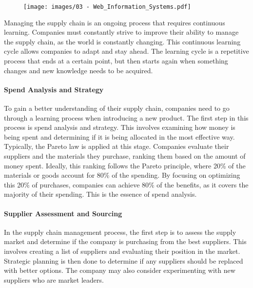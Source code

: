 \begin{figure}[!h]
  \centering
  \texttt{[image: images/03 - Web\_Information\_Systems.pdf]}
\end{figure}

Managing the supply chain is an ongoing process that requires continuous
learning. Companies must constantly strive to improve their ability to
manage the supply chain, as the world is constantly changing. This
continuous learning cycle allows companies to adapt and stay ahead. The
learning cycle is a repetitive process that ends at a certain point, but
then starts again when something changes and new knowledge needs to be
acquired.

\paragraph{Spend Analysis and
  Strategy}\label{spend-analysis-and-strategy}

To gain a better understanding of their supply chain, companies need to
go through a learning process when introducing a new product. The first
step in this process is spend analysis and strategy. This involves
examining how money is being spent and determining if it is being
allocated in the most effective way. Typically, the Pareto law is
applied at this stage. Companies evaluate their suppliers and the
materials they purchase, ranking them based on the amount of money
spent. Ideally, this ranking follows the Pareto principle, where 20\% of
the materials or goods account for 80\% of the spending. By focusing on
optimizing this 20\% of purchases, companies can achieve 80\% of the
benefits, as it covers the majority of their spending. This is the
essence of spend analysis.

\paragraph{Supplier Assessment and
  Sourcing}\label{supplier-assessment-and-sourcing}

In the supply chain management process, the first step is to assess the
supply market and determine if the company is purchasing from the best
suppliers. This involves creating a list of suppliers and evaluating
their position in the market. Strategic planning is then done to
determine if any suppliers should be replaced with better options. The
company may also consider experimenting with new suppliers who are
market leaders.

